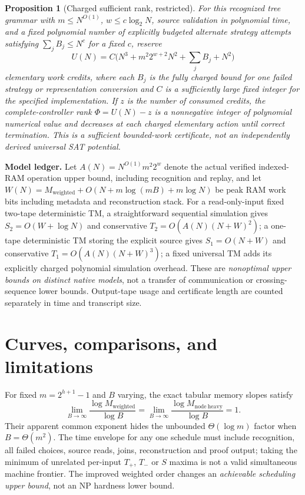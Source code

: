 \documentclass[11pt]{article}
\newtheorem{proposition}[theorem]{Proposition}
\begin{document}
\begin{proposition}[Charged sufficient rank, restricted]
For this recognized tree grammar with $m\le N^{O(1)}$, $w\le c\log_2N$, source validation in polynomial time, and a \emph{fixed polynomial number} of explicitly budgeted alternate strategy attempts satisfying $\sum_j B_j\le N^c$ for a fixed $c$, reserve
\[U(N)=C\bigl(N^3+m^2 2^{w+2}N^2+\sum_j B_j+N^2\bigr)\]
elementary work credits, where each $B_j$ is the fully charged bound for one failed strategy or representation conversion and $C$ is a sufficiently large fixed integer for the specified implementation. If $z$ is the number of consumed credits, the complete-controller rank $\Phi=U(N)-z$ is a nonnegative integer of \emph{polynomial numerical value} and decreases at each charged elementary action until correct termination. This is a sufficient bounded-work certificate, not an independently derived universal SAT potential.
\end{proposition}
\noindent\textbf{Model ledger.} Let $A(N)=N^{O(1)}m^2 2^w$ denote the actual verified indexed-RAM operation upper bound, including recognition and replay, and let $W(N)=M_{\mathrm{weighted}}+O(N+m\log(mB)+m\log N)$ be peak RAM work bits including metadata and reconstruction stack. For a read-only-input fixed two-tape deterministic TM, a straightforward sequential simulation gives $S_2=O(W+\log N)$ and conservative $T_2=O(A(N)(N+W)^2)$; a one-tape deterministic TM storing the explicit source gives $S_1=O(N+W)$ and conservative $T_1=O(A(N)(N+W)^3)$; a fixed universal TM adds its explicitly charged polynomial simulation overhead. These are \emph{nonoptimal upper bounds on distinct native models}, not a transfer of communication or crossing-sequence lower bounds. Output-tape usage and certificate length are counted separately in time and transcript size.

\section{Curves, comparisons, and limitations}
For fixed $m=2^{h+1}-1$ and $B$ varying, the exact tabular memory slopes satisfy
\[\lim_{B\to\infty}\frac{\log M_{\mathrm{weighted}}}{\log B}=
\lim_{B\to\infty}\frac{\log M_{\mathrm{node\ heavy}}}{\log B}=1.\]
Their apparent common exponent hides the unbounded $\Theta(\log m)$ factor when $B=\Theta(m^2)$. The time envelope for any one schedule must include recognition, all failed choices, source reads, joins, reconstruction and proof output; taking the minimum of unrelated per-input $T_+$, $T_-$ or $S$ maxima is not a valid simultaneous machine frontier. The improved weighted order changes an \emph{achievable scheduling upper bound}, not an NP hardness lower bound.
\end{document}

